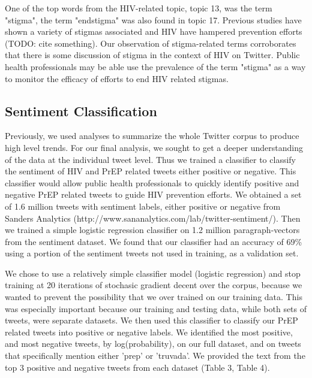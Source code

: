 \documentclass{sig-alternate-05-2015}
\begin{document}
One of the top words from the HIV-related topic, topic 13, was the term "stigma", the term "endstigma" was also found in topic 17. Previous studies have shown a variety of stigmas associated and HIV have hampered prevention efforts (TODO: cite something). Our observation of stigma-related terms corroborates that there is some discussion of stigma in the context of HIV on Twitter. Public health professionals may be able use the prevalence of the term "stigma" as a way to monitor the efficacy of efforts to end HIV related stigmas.

\subsection{Sentiment Classification}


Previously, we used analyses to summarize the whole Twitter corpus to produce high level trends. For our final analysis, we sought to get a deeper understanding of the data at the individual tweet level. Thus we trained a classifier to classify the sentiment of HIV and PrEP related tweets either positive or negative. This classifier would allow public health professionals to quickly identify positive and negative PrEP related tweets to guide HIV prevention efforts. We obtained a set of 1.6 million tweets with sentiment labels, either positive or negative from Sanders Analytics (http://www.sananalytics.com/lab/twitter-sentiment/). Then we trained a simple logistic regression classifier on 1.2 million paragraph-vectors from the sentiment dataset. We found that our classifier had an accuracy of 69\% using a portion of the sentiment tweets not used in training, as a validation set.

We chose to use a relatively simple classifier model (logistic regression) and stop training at 20 iterations of stochasic gradient decent over the corpus, because we wanted to prevent the possibility that we over trained on our training data. This was especially important because our training and testing data, while both sets of tweets, were separate datasets. We then used this classifier to classify our PrEP related tweets into positive or negative labels. We identified the most positive, and most negative tweets, by log(probability), on our full dataset, and on tweets that specifically mention either 'prep' or 'truvada'. We provided the text from the top 3 positive and negative tweets from each dataset (Table 3, Table 4).
\end{document}

